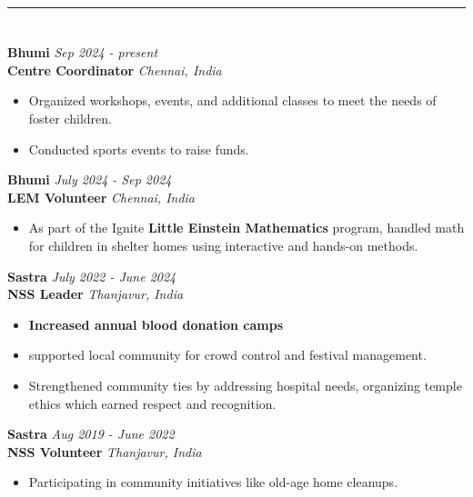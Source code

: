 \documentclass[a4paper,10pt]{article}
\begin{document}
\hrule
\section{\scshape\color{Fuchsia}{\faHandsHelping\ \textbf VOLUNTEERING \& EXTRACURRICULARS}}
\textbf{Bhumi} \href{https://www.bhumi.ngo/}{} \hfill \textit{Sep 2024 - present} \\
\textbf{Centre Coordinator} \hfill \textit{Chennai, India}
\vspace{-2mm}
\begin{itemize}
    \item Organized workshops, events, and additional classes to meet the needs of foster children.
    \vspace{-2mm}
    \item Conducted sports events to raise funds.
\end{itemize}
\vspace{-2mm}
\textbf{Bhumi} \hfill \textit{July 2024 - Sep 2024} \\
\textbf{LEM Volunteer} \hfill \textit{Chennai, India}
\vspace{-2mm}
\begin{itemize}
    \item As part of the Ignite \textbf{Little Einstein Mathematics} program, handled math for children in shelter homes using interactive and hands-on methods.
\end{itemize}
\vspace{-2mm}
\textbf{Sastra} \hfill \textit{July 2022 - June 2024} \\
\textbf{NSS Leader} \hfill \textit{Thanjavur, India}
\vspace{-2mm}
\begin{itemize}
    \item \textbf{Increased annual blood donation camps}
    \vspace{-2mm}
    \item supported local community for crowd control and festival management.
    \vspace{-2mm}
    \item Strengthened community ties by addressing hospital needs, organizing temple ethics which earned respect and recognition.
\end{itemize}
\vspace{-2mm}
\textbf{Sastra} \hfill \textit{Aug 2019 - June 2022} \\
\textbf{NSS Volunteer} \hfill \textit{Thanjavur, India}
\vspace{-2mm}
\begin{itemize}
    \item Participating in community initiatives like old-age home cleanups.
\end{itemize}
\end{document}
